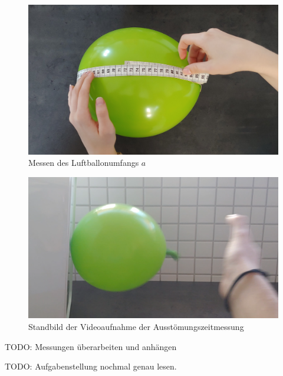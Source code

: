 \documentclass{article}
\begin{document}
    \printbibliography[title={Quellen}]

    \begin{figure}[h!]\label{fig:Umfang}
        \centering
        \includegraphics[width=\textwidth]{luftballon_umfang_messung.jpg}
        \caption{Messen des Luftballonumfangs \(a\)}
    \end{figure}

    \begin{figure}[h!]\label{fig:Festgeklebt}
        \centering
        \includegraphics[width=\textwidth]{lufballon_festgeklebt.png}
        \caption{Standbild der Videoaufnahme der Ausstömungszeitmessung}
    \end{figure}

    TODO: Messungen überarbeiten und anhängen

    TODO: Aufgabenstellung nochmal genau lesen.
    
\end{document}
